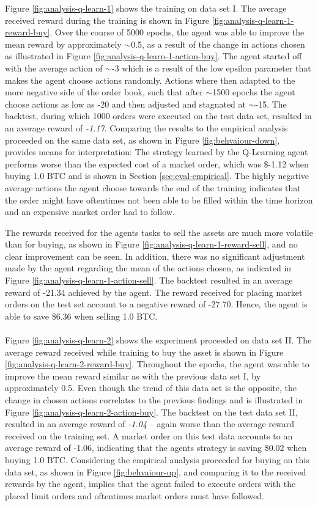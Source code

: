 Figure \ref{fig:analysis-q-learn-1} shows the training on data set I.
The average received reward during the training is shown in Figure \ref{fig:analysis-q-learn-1-reward-buy}.
Over the course of 5000 epochs, the agent was able to improve the mean reward by approximately $\sim$0.5, as a result of the change in actions chosen as illustrated in Figure \ref{fig:analysis-q-learn-1-action-buy}.
The agent started off with the average action of $\sim$-3 which is a result of the low epsilon parameter that makes the agent choose actions randomly.
Actions where then adapted to the more negative side of the order book, such that after $\sim$1500 epochs the agent choose actions as low as -20 and then adjusted and stagnated at $\sim$-15.
The backtest, during which 1000 orders were executed on the test data set, resulted in an average reward of \textit{-1.17}.
Comparing the results to the empirical analysis proceeded on the same data set, as shown in Figure \ref{fig:behvaiour-down}, provides means for interpretation:
The strategy learned by the Q-Learning agent performs worse than the expected cost of a market order, which was \$-1.12 when buying 1.0 BTC and is shown in Section \ref{sec:eval-empirical}.
The highly negative average actions the agent choose towards the end of the training indicates that the order might have oftentimes not been able to be filled within the time horizon and an expensive market order had to follow.

The rewards received for the agents tasks to sell the assets are much more volatile than for buying, as shown in Figure \ref{fig:analysis-q-learn-1-reward-sell}, and no clear improvement can be seen.
In addition, there was no significant adjustment made by the agent regarding the mean of the actions chosen, as indicated in Figure \ref{fig:analysis-q-learn-1-action-sell}.
The backtest resulted in an average reward of -21.34 achieved by the agent.
The reward received for placing market orders on the test set account to a negative reward of -27.70.
Hence, the agent is able to save \$6.36 when selling 1.0 BTC.
\\
\\
Figure \ref{fig:analysis-q-learn-2} shows the experiment proceeded on data set II.
The average reward received while training to buy the asset is shown in Figure \ref{fig:analysis-q-learn-2-reward-buy}.
Throughout the epochs, the agent was able to improve the mean reward similar as with the previous data set I, by approximately 0.5.
Even though the trend of this data set is the opposite, the change in chosen actions correlates to the previous findings and is illustrated in Figure \ref{fig:analysis-q-learn-2-action-buy}.
The backtest on the test data set II, resulted in an average reward of \textit{-1.04} -- again worse than the average reward received on the training set.
A market order on this test data accounts to an average reward of -1.06, indicating that the agents strategy is saving \$0.02 when buying 1.0 BTC.
Considering the empirical analysis proceeded for buying on this data set, as shown in Figure \ref{fig:behvaiour-up}, and comparing it to the received rewards by the agent, implies that the agent failed to execute orders with the placed limit orders and oftentimes market orders must have followed.

